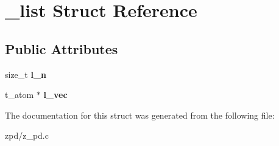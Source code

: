 \hypertarget{struct__list}{\section{\-\_\-list Struct Reference}
\label{struct__list}
}
\subsection*{Public Attributes}
\begin{DoxyCompactItemize}
\item 
\hypertarget{struct__list_a83cd73e1aaff9372d9af8a8b493a04aa}{size\-\_\-t {\bfseries l\-\_\-n}}\label{struct__list_a83cd73e1aaff9372d9af8a8b493a04aa}

\item 
\hypertarget{struct__list_ab30e3770b5412df1c6c96c1e2ab27004}{t\-\_\-atom $\ast$ {\bfseries l\-\_\-vec}}\label{struct__list_ab30e3770b5412df1c6c96c1e2ab27004}

\end{DoxyCompactItemize}


The documentation for this struct was generated from the following file\-:\begin{DoxyCompactItemize}
\item 
zpd/z\-\_\-pd.\-c\end{DoxyCompactItemize}
